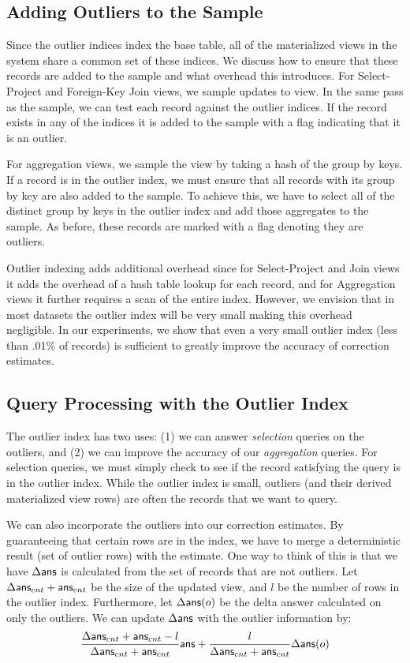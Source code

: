 \subsection{Adding Outliers to the Sample}
Since the outlier indices index the base table, all of the materialized views in the system share a common set of these indices.
We discuss how to ensure that these records are added to the sample and what overhead this introduces.
For Select-Project and Foreign-Key Join views, we sample updates to view.
In the same pass as the sample, we can test each record against the outlier indices. 
If the record exists in any of the indices it is added to the sample with a flag indicating that it is an outlier.

For aggregation views, we sample the view by taking a hash of the group by keys.
If a record is in the outlier index, we must ensure that all records with its group by key are also added to the sample.
To achieve this, we have to select all of the distinct group by keys in the outlier index and add those aggregates to the sample.
As before, these records are marked with a flag denoting they are outliers.

Outlier indexing adds additional overhead since for Select-Project and Join views it adds the overhead of a hash table lookup for each record, and for Aggregation views it further requires a scan of the entire index.
However, we envision that in most datasets the outlier index will be very small making this overhead negligible.
In our experiments, we show that even a very small outlier index (less than .01\% of records) is sufficient to greatly improve the accuracy of
correction estimates.

\subsection{Query Processing with the Outlier Index} 
The outlier index has two uses: (1) we can answer \emph{selection} queries on the outliers, 
and (2) we can improve the accuracy of our \emph{aggregation} queries.
For selection queries, we must simply check to see if the record satisfying the query is in the outlier index.
While the outlier index is small, outliers (and their derived materialized view rows) are often the records that
we want to query.

We can also incorporate the outliers into our correction estimates. 
By guaranteeing that certain rows are in the index, we
have to merge a deterministic result (set of outlier rows) with the
estimate. One way to think of this is that we have $\Delta\textsf{ans}$ is
calculated from the set of records that are not outliers. Let $\Delta\textsf{ans}_{cnt} + \textsf{ans}_{cnt}$
be the size of the updated view, and $l$ be the number of rows in the
outlier index. Furthermore, let $\Delta\textsf{ans}(o)$ be the delta answer calculated on only the outliers.
We can update $\Delta\textsf{ans}$ with the outlier information by:
\[
\frac{\Delta\textsf{ans}_{cnt} + \textsf{ans}_{cnt}-l}{\Delta\textsf{ans}_{cnt} + \textsf{ans}_{cnt}}\textsf{ans}+\frac{l}{\Delta\textsf{ans}_{cnt} + \textsf{ans}_{cnt}}\Delta\textsf{ans}(o)
\]